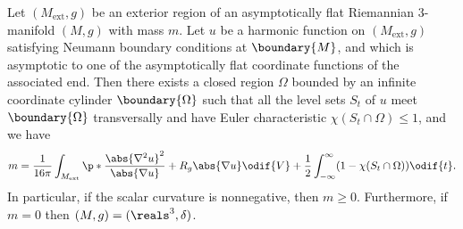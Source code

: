 \documentclass[titlepage,numbers=noenddot,oneside,%
cleardoublepage=empty,paper=a4,fontsize=11pt,%
english,%
]{scrartcl}
\newcommand{\ext}{\mathrm{ext}} %
\begin{document}
\begin{corollary}
    Let \( (M_{\ext},g) \) be an exterior region of an asymptotically flat Riemannian \( 3 \)-manifold \( (M, g) \) with mass \( m \). Let \( u \) be a harmonic function on \( (M_\ext, g) \) satisfying Neumann boundary conditions at \( \boundary{M} \), and which is asymptotic to one of the asymptotically flat coordinate functions of the associated end. Then there exists a closed region \( \Omega \) bounded by an infinite coordinate cylinder \( \boundary{\Omega}\) such that all the level sets \( S_t \) of \( u \) meet \( \boundary{\Omega} \) transversally and have Euler characteristic \( \chi(S_t \cap \Omega)\leq 1 \), and we have
    \begin{equation*}
        m = \frac{1}{16\pi}\int_{M_\ext} \p*{ \frac{\abs{\nabla^2 u}^2}{\abs{\nabla u}} + R_g\abs{\nabla u} } \odif{V}+\frac{1}{2}\int_{-\infty}^\infty (1-\chi(S_t \cap \Omega))\odif{t}.
    \end{equation*}
    In particular, if the scalar curvature is nonnegative, then \( m\geq 0 \). Furthermore, if \( m = 0 \) then \( (M,g) =(\reals^3,\delta)\).
\end{corollary}
\printbibliography
\end{document}
